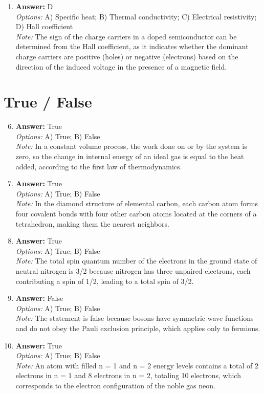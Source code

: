 \documentclass[12pt]{article}
\begin{document}
\begin{enumerate}[label=\arabic*.]
\item \textbf{Answer:} D
\\ \textit{Options:} A) Specific heat; B) Thermal conductivity; C) Electrical resistivity; D) Hall coefficient
\\ \textit{Note:} The sign of the charge carriers in a doped semiconductor can be determined from the Hall coefficient, as it indicates whether the dominant charge carriers are positive (holes) or negative (electrons) based on the direction of the induced voltage in the presence of a magnetic field.
\end{enumerate}

\section*{True / False}
\begin{enumerate}[label=\arabic*.]
\setcounter{enumi}{5}
\item \textbf{Answer:} True
\\ \textit{Options:} A) True; B) False
\\ \textit{Note:} In a constant volume process, the work done on or by the system is zero, so the change in internal energy of an ideal gas is equal to the heat added, according to the first law of thermodynamics.
\item \textbf{Answer:} True
\\ \textit{Options:} A) True; B) False
\\ \textit{Note:} In the diamond structure of elemental carbon, each carbon atom forms four covalent bonds with four other carbon atoms located at the corners of a tetrahedron, making them the nearest neighbors.
\item \textbf{Answer:} True
\\ \textit{Options:} A) True; B) False
\\ \textit{Note:} The total spin quantum number of the electrons in the ground state of neutral nitrogen is 3/2 because nitrogen has three unpaired electrons, each contributing a spin of 1/2, leading to a total spin of 3/2.
\item \textbf{Answer:} False
\\ \textit{Options:} A) True; B) False
\\ \textit{Note:} The statement is false because bosons have symmetric wave functions and do not obey the Pauli exclusion principle, which applies only to fermions.
\item \textbf{Answer:} True
\\ \textit{Options:} A) True; B) False
\\ \textit{Note:} An atom with filled n = 1 and n = 2 energy levels contains a total of 2 electrons in n = 1 and 8 electrons in n = 2, totaling 10 electrons, which corresponds to the electron configuration of the noble gas neon.
\end{enumerate}
\end{document}
